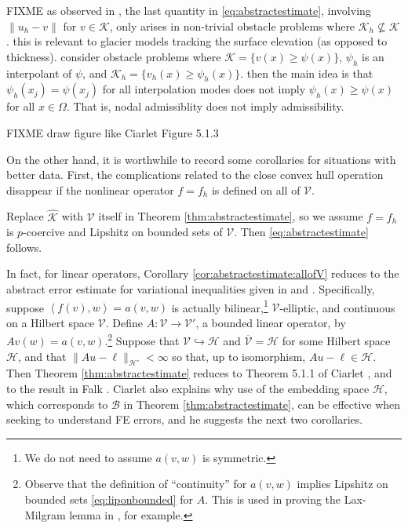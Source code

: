 \documentclass[hidelinks,onefignum,onetabnum,final]{siamart220329}  %
\newcommand{\cB}{\mathcal{B}}
\newcommand{\cH}{\mathcal{H}}
\newcommand{\cK}{\mathcal{K}}
\newcommand{\cV}{\mathcal{V}}
\newcommand{\hcK}{\widehat{\cK}}
\newcommand{\ip}[2]{\left<#1,#2\right>}
\begin{document}
FIXME as observed in \cite{Ciarlet2002}, the last quantity in \eqref{eq:abstractestimate}, involving $\|u_h-v\|$ for $v\in\cK$, only arises in non-trivial obstacle problems where $\cK_h \nsubseteq \cK$.  this is relevant to glacier models tracking the surface elevation (as opposed to thickness).  consider obstacle problems where $\cK=\{v(x)\ge \psi(x)\}$, $\psi_h$ is an interpolant of $\psi$, and $\cK_h=\{v_h(x)\ge \psi_h(x)\}$.  then the main idea is that $\psi_h(x_j)=\psi(x_j)$ for all interpolation modes does not imply $\psi_h(x) \ge \psi(x)$ for all $x\in\Omega$.  That is, nodal admissiblity does not imply admissibility.

FIXME draw figure like Ciarlet Figure 5.1.3

On the other hand, it is worthwhile to record some corollaries for situations with better data.  First, the complications related to the close convex hull operation disappear if the nonlinear operator $f=f_h$ is defined on all of $\cV$.

\begin{corollary}  \label{cor:abstractestimate:allofV}
Replace $\hcK$ with $\cV$ itself in Theorem \ref{thm:abstractestimate}, so we assume $f=f_h$ is $p$-coercive and Lipshitz on bounded sets of $\cV$.  Then \eqref{eq:abstractestimate} follows.
\end{corollary}

In fact, for linear operators, Corollary \ref{cor:abstractestimate:allofV} reduces to the abstract error estimate for variational inequalities given in \cite{Ciarlet2002} and \cite{Falk1974}.  Specifically, suppose $\ip{f(v)}{w}=a(v,w)$ is actually bilinear,\footnote{We do not need to assume $a(v,w)$ is symmetric.} $\cV$-elliptic, and continuous on a Hilbert space $\cV$.  Define $A:\cV\to\cV'$, a bounded linear operator, by $Av(w) = a(v,w)$.\footnote{Observe that the definition of ``continuity'' for $a(v,w)$ implies Lipshitz on bounded sets \eqref{eq:liponbounded} for $A$.  This is used in proving the Lax-Milgram lemma in \cite{Ciarlet2002}, for example.}  Suppose that $\cV\hookrightarrow \cH$ and $\overline{\cV} = \cH$ for some Hilbert space $\cH$, and that $\|Au-\ell\|_{\cH'} < \infty$ so that, up to isomorphism, $Au-\ell \in\cH$.  Then Theorem \ref{thm:abstractestimate} reduces to Theorem 5.1.1 of Ciarlet \cite{Ciarlet2002}, and to the result in Falk \cite{Falk1974}.  Ciarlet also explains why use of the embedding space $\cH$, which corresponds to $\cB$ in Theorem \ref{thm:abstractestimate}, can be effective when seeking to understand FE errors, and he suggests the next two corollaries. 
\end{document}
